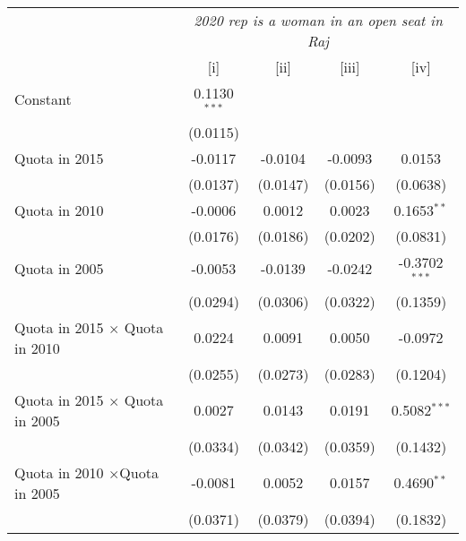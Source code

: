 
\begingroup
\centering
\begin{tabular}{lcccc}
   \toprule
    & \multicolumn{4}{c}{\textit{2020 rep is a woman in an open seat in Raj}}\\
                                                           & [i]            & [ii]          & [iii]         & [iv]\\  
   \midrule 
   Constant                                                & 0.1130$^{***}$ &               &               &   \\   
                                                           & (0.0115)       &               &               &   \\   
   Quota in 2015                                           & -0.0117        & -0.0104       & -0.0093       & 0.0153\\   
                                                           & (0.0137)       & (0.0147)      & (0.0156)      & (0.0638)\\   
   Quota in 2010                                           & -0.0006        & 0.0012        & 0.0023        & 0.1653$^{**}$\\   
                                                           & (0.0176)       & (0.0186)      & (0.0202)      & (0.0831)\\   
   Quota in 2005                                           & -0.0053        & -0.0139       & -0.0242       & -0.3702$^{***}$\\   
                                                           & (0.0294)       & (0.0306)      & (0.0322)      & (0.1359)\\   
   Quota in 2015 $\times$ Quota in 2010                      & 0.0224         & 0.0091        & 0.0050        & -0.0972\\   
                                                           & (0.0255)       & (0.0273)      & (0.0283)      & (0.1204)\\   
   Quota in 2015 $\times$ Quota in 2005                      & 0.0027         & 0.0143        & 0.0191        & 0.5082$^{***}$\\   
                                                           & (0.0334)       & (0.0342)      & (0.0359)      & (0.1432)\\   
   Quota in 2010 $\times$Quota in 2005                      & -0.0081        & 0.0052        & 0.0157        & 0.4690$^{**}$\\   
                                                           & (0.0371)       & (0.0379)      & (0.0394)      & (0.1832)\\   

\end{tabular}
